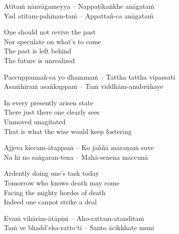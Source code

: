 \begin{verses}
  Atītaṁ nānvāgameyya – Nappaṭikaṅkhe anāgataṁ\\
  Yad atītam-pahīnan-taṁ – Appattañ-ca anāgataṁ
\end{verses}

\begin{english-verses}
  One should not revive the past\\
  Nor speculate on what's to come\\
  The past is left behind\\
  The future is unrealized
\end{english-verses}

\begin{verses}
  Paccuppannañ-ca yo dhammaṁ – Tattha tattha vipassati\\
  Asaṁhiraṁ asaṅkuppaṁ – Taṁ viddhām-anubrūhaye
\end{verses}

\begin{english-verses}
  In every presently arisen state\\
  There just there one clearly sees\\
  Unmoved unagitated\\
  That is what the wise would keep fostering\hyperlink{endnote43-appendix}{\hypertarget{endnote43-body}{}}
\end{english-verses}

\begin{verses}
  Ajjeva kiccam-ātappaṁ – Ko jaññā maraṇaṁ suve\\
  Na hi no saṅgaran-tena – Mahā-senena maccunā
\end{verses}

\begin{english-verses}
  Ardently doing one's task today\\
  Tomorrow who knows death may come\\
  Facing the mighty hordes of death\\
  Indeed one cannot strike a deal
\end{english-verses}

\begin{verses}
  Evaṁ vihārim-ātāpiṁ – Aho-rattam-atanditaṁ\\
  Taṁ ve bhadd'eka-ratto'ti – Santo ācikkhate muni
\end{verses}

